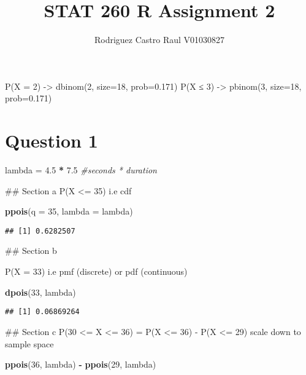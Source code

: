 \documentclass[
]{article}
\title{STAT 260 R Assignment 2}
\author{Rodriguez Castro Raul V01030827}
\date{}
\newenvironment{Shaded}{\begin{snugshade}}{\end{snugshade}}
\newcommand{\AttributeTok}[1]{\textcolor[rgb]{0.13,0.29,0.53}{#1}}
\newcommand{\CommentTok}[1]{\textcolor[rgb]{0.56,0.35,0.01}{\textit{#1}}}
\newcommand{\DecValTok}[1]{\textcolor[rgb]{0.00,0.00,0.81}{#1}}
\newcommand{\FloatTok}[1]{\textcolor[rgb]{0.00,0.00,0.81}{#1}}
\newcommand{\FunctionTok}[1]{\textcolor[rgb]{0.13,0.29,0.53}{\textbf{#1}}}
\newcommand{\NormalTok}[1]{#1}
\newcommand{\OtherTok}[1]{\textcolor[rgb]{0.56,0.35,0.01}{#1}}
\newcommand{\SpecialCharTok}[1]{\textcolor[rgb]{0.81,0.36,0.00}{\textbf{#1}}}
\begin{document}
\maketitle

P(X = 2) -\textgreater{} dbinom(2, size=18, prob=0.171) P(X ≤ 3)
-\textgreater{} pbinom(3, size=18, prob=0.171)

\hypertarget{question-1}{%
\section{Question 1}\label{question-1}}

\begin{Shaded}
\begin{Highlighting}[]
\NormalTok{lambda }\OtherTok{=} \FloatTok{4.5} \SpecialCharTok{*} \FloatTok{7.5} \CommentTok{\#seconds * duration}
\end{Highlighting}
\end{Shaded}

\#\# Section a P(X \textless= 35) i.e cdf

\begin{Shaded}
\begin{Highlighting}[]
  \FunctionTok{ppois}\NormalTok{(}\AttributeTok{q =} \DecValTok{35}\NormalTok{, }\AttributeTok{lambda =}\NormalTok{ lambda)}
\end{Highlighting}
\end{Shaded}

\begin{verbatim}
## [1] 0.6282507
\end{verbatim}

\#\# Section b

P(X = 33) i.e pmf (discrete) or pdf (continuous)

\begin{Shaded}
\begin{Highlighting}[]
  \FunctionTok{dpois}\NormalTok{(}\DecValTok{33}\NormalTok{, lambda)}
\end{Highlighting}
\end{Shaded}

\begin{verbatim}
## [1] 0.06869264
\end{verbatim}

\#\# Section c P(30 \textless= X \textless= 36) = P(X \textless= 36) -
P(X \textless= 29) scale down to sample space

\begin{Shaded}
\begin{Highlighting}[]
\FunctionTok{ppois}\NormalTok{(}\DecValTok{36}\NormalTok{, lambda) }\SpecialCharTok{{-}} \FunctionTok{ppois}\NormalTok{(}\DecValTok{29}\NormalTok{, lambda)}
\end{Highlighting}
\end{Shaded}
\end{document}
